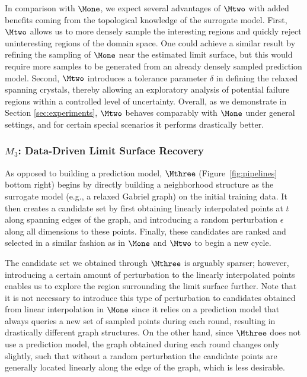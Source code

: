 In comparison with $\Mone$, we expect several advantages of $\Mtwo$ with added benefits coming from the topological knowledge of the surrogate model.
%
First, $\Mtwo$ allows us to more densely sample the interesting regions and quickly reject uninteresting regions of the domain space. One could achieve a similar result by refining the sampling of $\Mone$ near the estimated limit surface, but this would require more samples to be generated from an already densely sampled prediction model.
%
Second, $\Mtwo$ introduces a tolerance parameter $\delta$ in defining the relaxed spanning crystals, thereby allowing an exploratory analysis of potential failure regions within a controlled level of uncertainty.
%
Overall, as we demonstrate in Section \ref{sec:experiments}, $\Mtwo$ behaves comparably with $\Mone$ under general settings, and for certain special scenarios it performs drastically better.

\subsubsection{$M_3$: Data-Driven Limit Surface Recovery}
As opposed to building a prediction model, $\Mthree$ (Figure~\ref{fig:pipelines} bottom right) begins by directly building a neighborhood structure as the surrogate model (e.g., a relaxed Gabriel graph) on the initial training data.
%
It then creates a candidate set by first obtaining linearly interpolated points at $t$ along spanning edges of the graph, and introducing a random perturbation $\epsilon$ along all dimensions to these points.
%
Finally, these candidates are ranked and selected in a similar fashion as in $\Mone$ and $\Mtwo$ to begin a new cycle.

The candidate set we obtained through $\Mthree$ is arguably sparser; however, introducing a certain amount of perturbation to the linearly interpolated points enables us to explore the region surrounding the limit surface further.
%
Note that it is not necessary to introduce this type of perturbation to candidates obtained from linear interpolation in $\Mone$ since it relies on a prediction model that always queries a new set of sampled points during each round, resulting in drastically different graph structures.
%
On the other hand, since $\Mthree$ does not use a prediction model, the graph obtained during each round changes only slightly, such that without a random perturbation the candidate points are generally located linearly along the edge of the graph, which is less desirable.


